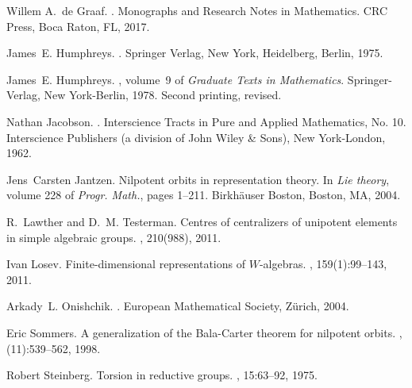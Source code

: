 \documentclass[a4paper,10pt]{amsart}
\numberwithin{equation}{section}
\theoremstyle{remark}
\theoremstyle{remark}
\begin{document}
\begin{thebibliography}{10}
Willem A.~de Graaf.
.
\newblock Monographs and Research Notes in Mathematics. CRC Press, Boca Raton,
  FL, 2017.

James~E. Humphreys.
.
\newblock Springer Verlag, New York, Heidelberg, Berlin, 1975.

James~E. Humphreys.
,
  volume~9 of {\em Graduate Texts in Mathematics}.
\newblock Springer-Verlag, New York-Berlin, 1978.
\newblock Second printing, revised.

Nathan Jacobson.
.
\newblock Interscience Tracts in Pure and Applied Mathematics, No. 10.
  Interscience Publishers (a division of John Wiley \& Sons), New York-London,
  1962.

Jens~Carsten Jantzen.
\newblock Nilpotent orbits in representation theory.
\newblock In {\em Lie theory}, volume 228 of {\em Progr. Math.}, pages 1--211.
  Birkh\"{a}user Boston, Boston, MA, 2004.

R.~Lawther and D.~M. Testerman.
\newblock Centres of centralizers of unipotent elements in simple algebraic
  groups.
, 210(988), 2011.

Ivan Losev.
\newblock Finite-dimensional representations of {$W$}-algebras.
, 159(1):99--143, 2011.

Arkady~L. Onishchik.
.
\newblock European Mathematical Society, Z\"urich, 2004.

Eric Sommers.
\newblock A generalization of the {B}ala-{C}arter theorem for nilpotent orbits.
, (11):539--562, 1998.

Robert Steinberg.
\newblock Torsion in reductive groups.
, 15:63--92, 1975.

\end{thebibliography}
\end{document}
